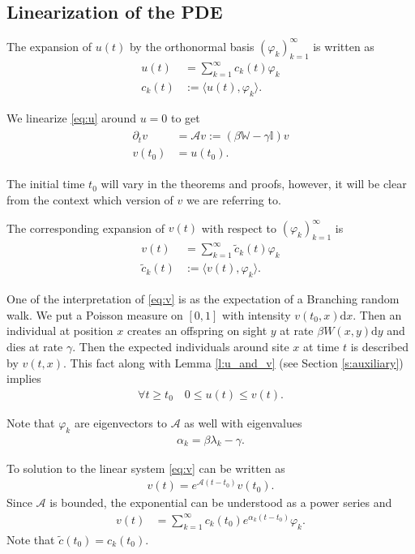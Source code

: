 \documentclass{article}
\renewcommand{\d}{\mathrm{d}}
\newcommand{\W}{\mathbb{W}}
\newcommand{\1}[1]{{\mathds{1}}_{\left\{#1\right\}}}
\begin{document}
\subsection{Linearization of the PDE}
\label{s:linear}
The expansion of $u(t)$ by the orthonormal basis $\left(\varphi_k\right)_{k=1}^{\infty}$ is written as
\begin{align}
\label{eq:u_expansion}
u(t)&=\sum_{k=1}^{\infty}c_k(t)\varphi_k\\
\label{eq:c_k}
c_k(t)&:= \langle u(t), \varphi_k \rangle. 
\end{align}

We linearize \eqref{eq:u} around $u=0$ to get
\begin{align}
\label{eq:v}
\begin{split}
\partial_t v&= \mathcal{A}v:=\left(\beta \W-\gamma\mathbb{I} \right)v \\
v(t_0)&=u(t_0).
\end{split}
\end{align}

The initial time $t_0$ will vary in the theorems and proofs, however, it will be clear from the context which version of $v$ we are referring to.

The corresponding expansion of $v(t)$ with respect to $\left( \varphi_k \right)_{k=1}^{\infty}$ is
\begin{align*}
v(t)&=\sum_{k=1}^{\infty}\tilde{c}_k(t)\varphi_k \\
\tilde{c}_k(t)&:= \langle v(t), \varphi_k \rangle.	
\end{align*}

One of the interpretation of \eqref{eq:v} is as the expectation of a Branching random walk. We put a Poisson measure on $[0,1]$ with intensity $v(t_0,x) \d x$. Then an individual at position $x$ creates an offspring on sight $y$ at rate $\beta W(x,y) \d y$ and dies at rate $\gamma$. Then the expected individuals around site $x$ at time $t$ is described by $v(t,x)$. This fact along with Lemma \ref{l:u_and_v} (see Section \ref{s:auxiliary}) implies
\begin{align*}
 \forall t \geq t_0 \quad 0 \leq u(t) \leq v(t).
\end{align*}


Note that $\varphi_k$ are eigenvectors to $\mathcal{A}$ as well with eigenvalues
\begin{align*}
\alpha_k=\beta \lambda_k-\gamma.
\end{align*}

To solution to the linear system \eqref{eq:v} can be written as
\begin{align*}
v(t)=e^{\mathcal{A}(t-t_0)}v(t_0).
\end{align*}
Since $\mathcal{A}$ is bounded, the exponential can be understood as a power series and
\begin{align}
\label{eq:v_expanded}
v(t)&= \sum_{k=1}^{\infty} c_k(t_0)e^{\alpha_k(t-t_0)} \varphi_k. 
\end{align}
Note that $\tilde{c}(t_0)=c_k(t_0).$
\end{document}

